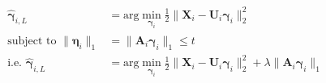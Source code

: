 \documentclass[11pt]{article}
\newcommand{\R}{\mathbb R}
\newcommand{\bX}{\mathbf X}
\newcommand{\bA}{\mathbf A}
\newcommand{\bM}{\mathbf M}
\newcommand{\bI}{\mathbf I}
\newcommand{\bU}{\mathbf U}
\newcommand{\bseta}{\boldsymbol{\eta}}
\newcommand{\bgamma}{\boldsymbol{\gamma}}
\begin{document}


\begin{equation}
    \label{eq:glars}
    \begin{aligned}
    \hat{\bgamma}_{i,L} &= \text{arg} \min_{\substack{\bgamma_i}} \frac{1}{2}\|\bX_i - \bU_i \bgamma_i\|_2^2 \\
    \text{subject to } \|\bseta_i\|_1 &= \|\bA_i \bgamma_i\|_1 \leq t\\
    \text{i.e. }\hat{\bgamma}_{i,L} &= \text{arg} \min_{\substack{\bgamma_i}} \frac{1}{2}\|\bX_i - \bU_i \bgamma_i\|_2^2 + \lambda \|\bA_i \bgamma_i\|_1\\
    \end{aligned}
\end{equation}
\end{document}
